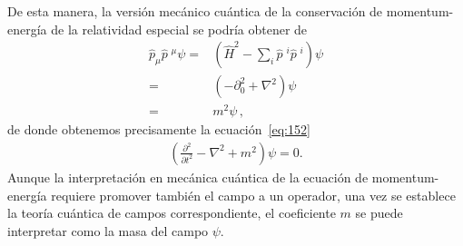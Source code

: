 De esta manera, la versión mecánico cuántica de la conservación de momentum-energía de la relatividad especial se podría obtener de
\begin{align}
  \widehat{p}_{\mu}\widehat{p}\;^{\mu}\psi=&\left( \widehat{H}^{2}-\sum_{i}\widehat{p}\;^i\widehat{p}\;^i \right)\psi \nonumber\\
=&\left( -\partial_0^2+\nabla^2 \right)\psi \nonumber\\
=& m^2 \psi\,,
\end{align}
de donde obtenemos precisamente la ecuación~\eqref{eq:152}
\begin{align}
  \left(
\frac{\partial^2}{\partial t^2}-\nabla^2+m^2
  \right)\psi=0.
\end{align}
Aunque la interpretación en mecánica cuántica de la ecuación de momentum-energía requiere promover también el campo a un operador, una vez se establece la teoría cuántica de campos correspondiente, el coeficiente $m$ se puede interpretar como la masa del campo $\psi$.




